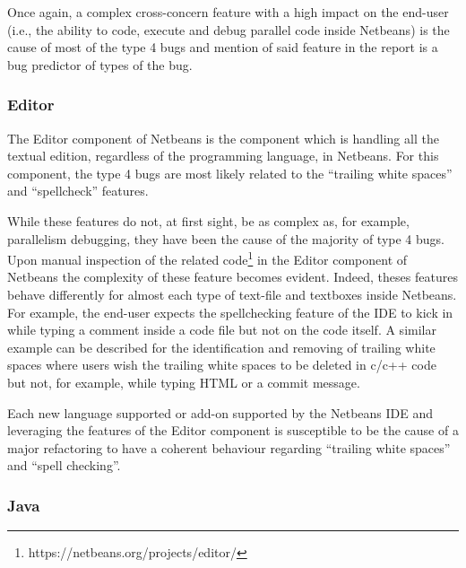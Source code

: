 \documentclass[12pt]{report}
\begin{document}
Once again, a complex cross-concern feature with a high impact on the
end-user (i.e., the ability to code, execute and debug parallel code
inside Netbeans) is the cause of most of the type 4 bugs and mention of
said feature in the report is a bug predictor of types of the bug.

\subsubsection{Editor}\label{editor}

The Editor component of Netbeans is the component which is handling all
the textual edition, regardless of the programming language, in
Netbeans. For this component, the type 4 bugs are most likely related to
the ``trailing white spaces'' and ``spellcheck'' features.

While these features do not, at first sight, be as complex as, for
example, parallelism debugging, they have been the cause of the majority
of type 4 bugs. Upon manual inspection of the related
code\footnote{https://netbeans.org/projects/editor/} in the Editor
component of Netbeans the complexity of these feature becomes evident.
Indeed, theses features behave differently for almost each type of
text-file and textboxes inside Netbeans. For example, the end-user
expects the spellchecking feature of the IDE to kick in while typing a
comment inside a code file but not on the code itself. A similar example
can be described for the identification and removing of trailing white
spaces where users wish the trailing white spaces to be deleted in c/c++
code but not, for example, while typing HTML or a commit message.

Each new language supported or add-on supported by the Netbeans IDE and
leveraging the features of the Editor component is susceptible to be the
cause of a major refactoring to have a coherent behaviour regarding
``trailing white spaces'' and ``spell checking''.

\subsubsection{Java}\label{java}
\end{document}
